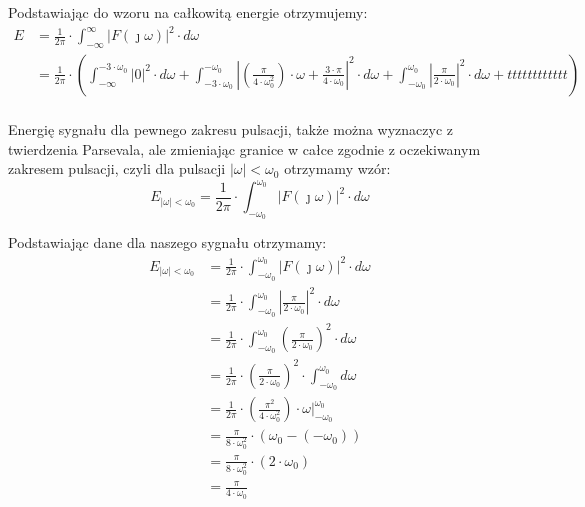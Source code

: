 \begin{task}
Podstawiając do wzoru na całkowitą energie otrzymujemy:
\begin{align*}
E &= \frac{1}{2\pi} \cdot \int_{-\infty}^{\infty} \left|F(\jmath \omega)\right|^2 \cdot d\omega\\
&= \frac{1}{2\pi} \cdot \left(\int_{-\infty}^{-3 \cdot \omega_0} \left|0\right|^2 \cdot d\omega + \int_{-3 \cdot \omega_0}^{-\omega_0} \left|\left(\frac{\pi}{4 \cdot \omega_0^2}\right) \cdot \omega + \frac{3 \cdot \pi}{4 \cdot \omega_0}\right|^2 \cdot d\omega + \int_{-\omega_0}^{\omega_0} \left|\frac{\pi}{2 \cdot \omega_0}\right|^2 \cdot d\omega + tttttttttttt\right)\\
\end{align*}




Energię sygnału dla pewnego zakresu pulsacji, także można wyznaczyc z twierdzenia Parsevala, ale zmieniając granice w całce zgodnie z oczekiwanym zakresem pulsacji, czyli dla pulsacji $\left| \omega \right| < \omega_0$ otrzymamy wzór:
\begin{equation}
 E_{\left| \omega \right| < \omega_0} = \frac{1}{2\pi} \cdot \int_{-\omega_0}^{\omega_0} \left|F(\jmath \omega)\right|^2 \cdot d\omega
\end{equation}

Podstawiając dane dla naszego sygnału otrzymamy:
\begin{align*}
E_{\left| \omega \right| < \omega_0} &= \frac{1}{2\pi} \cdot \int_{-\omega_0}^{\omega_0} \left|F(\jmath \omega)\right|^2 \cdot d\omega\\
&= \frac{1}{2\pi} \cdot \int_{-\omega_0}^{\omega_0} \left|\frac{\pi}{2 \cdot \omega_0}\right|^2 \cdot d\omega\\
&= \frac{1}{2\pi} \cdot \int_{-\omega_0}^{\omega_0} \left(\frac{\pi}{2 \cdot \omega_0}\right)^2 \cdot d\omega\\
&= \frac{1}{2\pi} \cdot \left(\frac{\pi}{2 \cdot \omega_0}\right)^2 \cdot \int_{-\omega_0}^{\omega_0} d\omega\\
&= \frac{1}{2\pi} \cdot \left(\frac{\pi^2}{4 \cdot \omega_0^2}\right) \cdot \left.\omega\right|_{-\omega_0}^{\omega_0}\\
&= \frac{\pi}{8 \cdot \omega_0^2} \cdot (\omega_0 - (-\omega_0))\\
&= \frac{\pi}{8 \cdot \omega_0^2} \cdot (2 \cdot \omega_0)\\
&= \frac{\pi}{4 \cdot \omega_0}\\
\end{align*}



\end{task}

